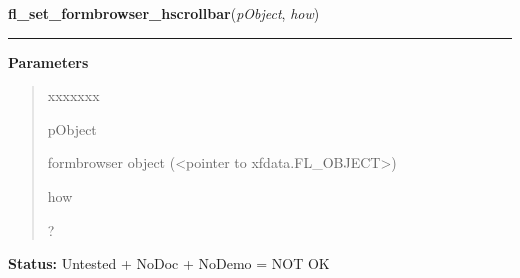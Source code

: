 \hspace{.8\funcindent}\begin{boxedminipage}{\funcwidth}

    \raggedright \textbf{fl\_set\_formbrowser\_hscrollbar}(\textit{pObject}, \textit{how})

    \vspace{-1.5ex}

    \rule{\textwidth}{0.5\fboxrule}
\setlength{\parskip}{2ex}
\setlength{\parskip}{1ex}
      \textbf{Parameters}
      \vspace{-1ex}

      \begin{quote}
        \begin{Ventry}{xxxxxxx}

          \item[pObject]

          formbrowser object ({\textless}pointer to 
          xfdata.FL\_OBJECT{\textgreater})

          \item[how]

          ?

        \end{Ventry}

      \end{quote}

\textbf{Status:} Untested + NoDoc + NoDemo = NOT OK



    \end{boxedminipage}

    \label{xformslib:library:fl_set_formbrowser_vscrollbar}

    \vspace{0.5ex}

